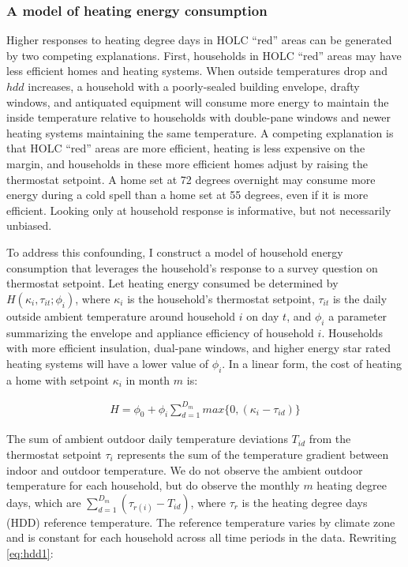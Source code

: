 \documentclass[
]{article}
\begin{document}
\hypertarget{a-model-of-heating-energy-consumption}{%
\subsubsection{A model of heating energy consumption}\label{a-model-of-heating-energy-consumption}}

Higher responses to heating degree days in HOLC ``red'' areas can be generated by two competing explanations. First, households in HOLC ``red'' areas may have less efficient homes and heating systems. When outside temperatures drop and \(hdd\) increases, a household with a poorly-sealed building envelope, drafty windows, and antiquated equipment will consume more energy to maintain the inside temperature relative to households with double-pane windows and newer heating systems maintaining the same temperature. A competing explanation is that HOLC ``red'' areas are more efficient, heating is less expensive on the margin, and households in these more efficient homes adjust by raising the thermostat setpoint. A home set at 72 degrees overnight may consume more energy during a cold spell than a home set at 55 degrees, even if it is more efficient. Looking only at household response is informative, but not necessarily unbiased.

To address this confounding, I construct a model of household energy consumption that leverages the household's response to a survey question on thermostat setpoint. Let heating energy consumed be determined by \(H(\kappa_i, \tau_{it}; \phi_i)\), where \(\kappa_i\) is the household's thermostat setpoint, \(\tau_{it}\) is the daily outside ambient temperature around household \(i\) on day \(t\), and \(\phi_i\) a parameter summarizing the envelope and appliance efficiency of household \(i\). Households with more efficient insulation, dual-pane windows, and higher energy star rated heating systems will have a lower value of \(\phi_i\). In a linear form, the cost of heating a home with setpoint \(\kappa_i\) in month \(m\) is:

\begin{eqnarray}
H = \phi_0 + \phi_i \sum_{d=1}^{D_m}max\{0, (\kappa_i - \tau_{id})\} \label{eq:hdd1}
\end{eqnarray}

The sum of ambient outdoor daily temperature deviations \(T_{id}\) from the thermostat setpoint \(\tau_i\) represents the sum of the temperature gradient between indoor and outdoor temperature. We do not observe the ambient outdoor temperature for each household, but do observe the monthly \(m\) heating degree days, which are \(\sum_{d=1}^{D_m}(\tau_{r(i)} - T_{id})\), where \(\tau_r\) is the heating degree days (HDD) reference temperature. The reference temperature varies by climate zone and is constant for each household across all time periods in the data. Rewriting \ref{eq:hdd1}:
\end{document}
